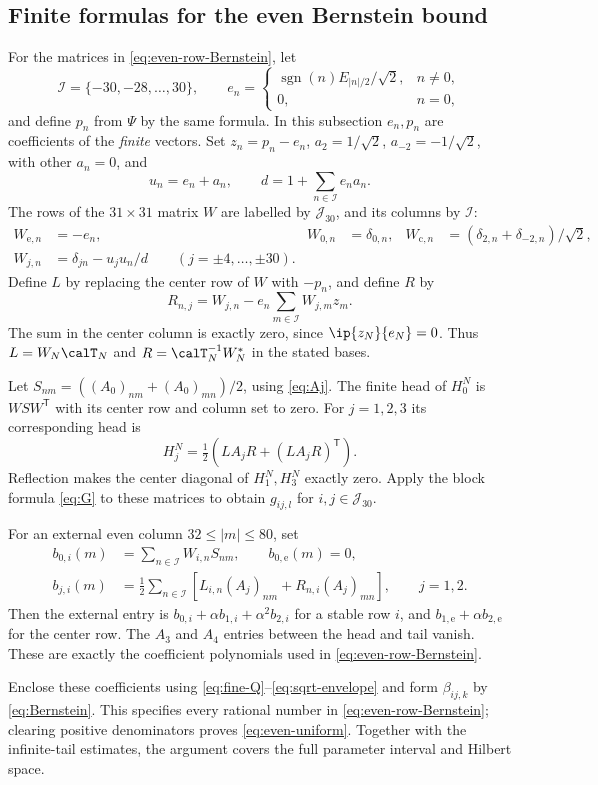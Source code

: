 \subsection{Finite formulas for the even Bernstein bound}
For the matrices in \eqref{eq:even-row-Bernstein}, let
\[
 \mathcal I=\{-30,-28,\ldots,30\},\qquad
 e_n=\begin{cases}\operatorname{sgn}(n)E_{|n|/2}/\sqrt2,&n\ne0,\\0,&n=0,\end{cases}
\]
and define $p_n$ from $\Psi$ by the same formula. In this subsection $e_n,p_n$ are coefficients of the \emph{finite} vectors. Set $z_n=p_n-e_n$, $a_2=1/\sqrt2$, $a_{-2}=-1/\sqrt2$, with other $a_n=0$, and
\[
 u_n=e_n+a_n,\qquad d=1+\sum_{n\in\mathcal I}e_na_n.
\]
The rows of the $31\times31$ matrix $W$ are labelled by $\mathcal J_{30}$, and its columns by $\mathcal I$:
\begin{equation}\label{eq:W-finite}
\begin{aligned}
 W_{\mathrm e,n}&=-e_n,&W_{0,n}&=\delta_{0,n},&
 W_{\mathrm c,n}&=(\delta_{2,n}+\delta_{-2,n})/\sqrt2,\\
 W_{j,n}&=\delta_{jn}-u_ju_n/d\qquad(j=\pm4,\ldots,\pm30).
\end{aligned}
\end{equation}
Define $L$ by replacing the center row of $W$ with $-p_n$, and define $R$ by
\begin{equation}\label{eq:LR-finite}
 R_{n,j}=W_{j,n}-e_n\sum_{m\in\mathcal I}W_{j,m}z_m.
\end{equation}
The sum in the center column is exactly zero, since $\ip{z_N}{e_N}=0$. Thus $L=W_N\calT_N$ and $R=\calT_N^{-1}W_N^*$ in the stated bases.

Let $S_{nm}=((A_0)_{nm}+(A_0)_{mn})/2$, using \eqref{eq:Aj}. The finite head of $H_0^N$ is $WSW^{\mathsf T}$ with its center row and column set to zero. For $j=1,2,3$ its corresponding head is
\[
 H_j^N=\tfrac12\left(LA_jR+(LA_jR)^{\mathsf T}\right).
\]
Reflection makes the center diagonal of $H_1^N,H_3^N$ exactly zero. Apply the block formula \eqref{eq:G} to these matrices to obtain $g_{ij,l}$ for $i,j\in\mathcal J_{30}$.

For an external even column $32\le|m|\le80$, set
\begin{align}
 b_{0,i}(m)&=\sum_{n\in\mathcal I}W_{i,n}S_{nm},\qquad b_{0,\mathrm e}(m)=0,\label{eq:external-b}\\
 b_{j,i}(m)&=\tfrac12\sum_{n\in\mathcal I}
 \left[L_{i,n}(A_j)_{nm}+R_{n,i}(A_j)_{mn}\right],\qquad j=1,2.
 \nonumber
\end{align}
Then the external entry is $b_{0,i}+\alpha b_{1,i}+\alpha^2b_{2,i}$ for a stable row $i$, and $b_{1,\mathrm e}+\alpha b_{2,\mathrm e}$ for the center row. The $A_3$ and $A_4$ entries between the head and tail vanish. These are exactly the coefficient polynomials used in \eqref{eq:even-row-Bernstein}.

Enclose these coefficients using \eqref{eq:fine-Q}--\eqref{eq:sqrt-envelope} and form $\beta_{ij,k}$ by \eqref{eq:Bernstein}. This specifies every rational number in \eqref{eq:even-row-Bernstein}; clearing positive denominators proves \eqref{eq:even-uniform}. Together with the infinite-tail estimates, the argument covers the full parameter interval and Hilbert space.
